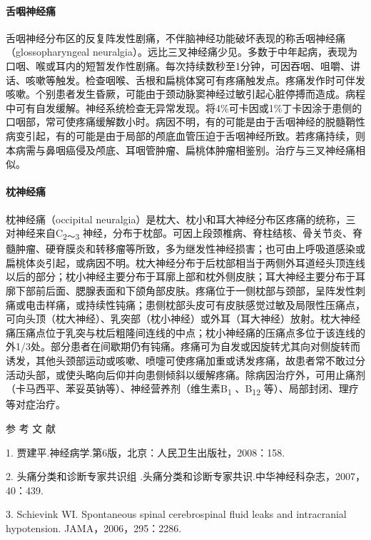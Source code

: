 \paragraph{舌咽神经痛}

舌咽神经分布区的反复阵发性剧痛，不伴脑神经功能破坏表现的称舌咽神经痛（glossopharyngeal
neuralgia）。远比三叉神经痛少见。多数于中年起病，表现为口咽、喉或耳内的短暂发作性剧痛。每次持续数秒至1分钟，可因吞咽、咀嚼、讲话、咳嗽等触发。检查咽喉、舌根和扁桃体窝可有疼痛触发点。疼痛发作时可伴发咳嗽。个别患者发生昏厥，可能由于颈动脉窦神经过敏引起心脏停搏而造成。病程中可有自发缓解。神经系统检查无异常发现。将4\%可卡因或1\%丁卡因涂于患侧的口咽部，常可使疼痛缓解数小时。病因不明，有的可能是由于舌咽神经的脱髓鞘性病变引起，有的可能是由于局部的颅底血管压迫于舌咽神经所致。若疼痛持续，则本病需与鼻咽癌侵及颅底、耳咽管肿瘤、扁桃体肿瘤相鉴别。治疗与三叉神经痛相似。

\paragraph{枕神经痛}

枕神经痛（occipital
neuralgia）是枕大、枕小和耳大神经分布区疼痛的统称，三对神经来自C\textsubscript{2～3}
神经，分布于枕部。可因上段颈椎病、脊柱结核、骨关节炎、脊髓肿瘤、硬脊膜炎和转移瘤等所致，多为继发性神经损害；也可由上呼吸道感染或扁桃体炎引起，或病因不明。枕大神经分布于后枕部相当于两侧外耳道经头顶连线以后的部分；枕小神经主要分布于耳廓上部和枕外侧皮肤；耳大神经主要分布于耳廓下部前后面、腮腺表面和下颌角部皮肤。疼痛位于一侧枕部与颈部，呈阵发性刺痛或电击样痛，或持续性钝痛；患侧枕部头皮可有皮肤感觉过敏及局限性压痛点，可向头顶（枕大神经）、乳突部（枕小神经）或外耳（耳大神经）放射。枕大神经痛压痛点位于乳突与枕后粗隆间连线的中点；枕小神经痛的压痛点多位于该连线的外1/3处。部分患者在间歇期仍有钝痛。疼痛可为自发或因旋转尤其向对侧旋转而诱发，其他头颈部运动或咳嗽、喷嚏可使疼痛加重或诱发疼痛，故患者常不敢过分活动头部，或使头略向后仰并向患侧倾斜以缓解疼痛。除病因治疗外，可用止痛剂（卡马西平、苯妥英钠等）、神经营养剂（维生素B\textsubscript{1}
、B\textsubscript{12} 等）、局部封闭、理疗等对症治疗。


\hypertarget{text00021.htmlux5cux23CHP1-7-5}{}
参 考 文 献

1. 贾建平.神经病学.第6版，北京：人民卫生出版社，2008：158.

2. 头痛分类和诊断专家共识组
.头痛分类和诊断专家共识.中华神经科杂志，2007，40：439.

3. Schievink WI. Spontaneous spinal cerebrospinal fluid leaks and
intracranial hypotension. JAMA，2006，295：2286.

